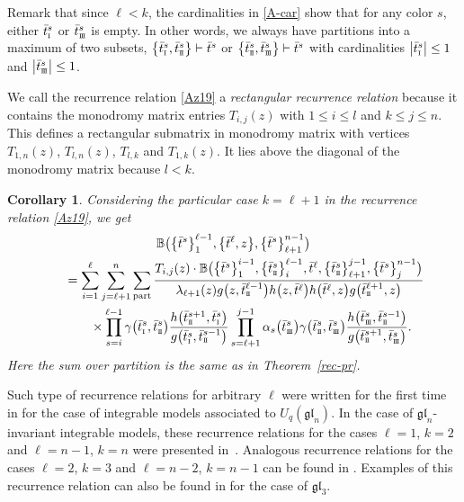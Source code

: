 \documentclass[pdftex]{sigma}
\newcommand{\so}{\scriptscriptstyle \rm I}
\newcommand{\st}{\scriptscriptstyle \rm I\hspace{-1pt}I}
\newcommand{\sth}{\scriptscriptstyle \rm I\hspace{-1pt}I\hspace{-1pt}I}
\newcommand{\bt}{{\bar t}}
\newtheorem{cor}[thm]{Corollary}
\theoremstyle{definition}
\def\BB{{\mathbb{B}}}
\def\r#1{\eqref{#1}}
\begin{document}
Remark that since $\ell<k$, the cardinalities in \eqref{A-car} show that for any color $s$, either $\bt^s_{\so}$ or $\bt^s_{\sth}$ is empty.
In other words, we always have partitions into a maximum of two subsets,
$ \bigl\{\bt^s_{\so},\bt^s_{\st}\bigr\}\vdash \bt^s$ or
$\bigl\{\bt^s_{\st},\bt^s_{\sth}\bigr\}\vdash \bt^s$
with cardinalities $\big|\bt^s_{\so}\big|\leq1$ and $\big|\bt^s_{\sth}\big|\leq1$.

We call the recurrence relation \r{Az19} a {\it rectangular recurrence relation} because
it contains the monodromy matrix entries $T_{i,j}(z)$ with $1\leq i\leq l$ and $k\leq j\leq n$.
This defines a rectangular submatrix in monodromy matrix with
vertices $T_{1,n}(z)$, $T_{l,n}(z)$, $T_{l,k}$ and $T_{1,k}(z)$. It lies above the diagonal of the monodromy matrix because $l<k$.


\begin{cor}\label{cor1}
Considering the particular case $k=\ell+1$ in the recurrence relation \r{Az19}, we get
\begin{gather*}
\BB\bigl(\bigl\{\bt^s\bigr\}_1^{\ell-1},\bigl\{\bt^\ell,z\bigr\},\bigl\{\bt^s\bigr\}_{\ell+1}^{n-1}\bigr)\\
\qquad=
\sum_{i=1}^\ell\sum_{j=\ell+1}^n\sum_{\rm part}\frac{T_{i,j}(z)\cdot
\BB\bigl(\bigl\{\bt^s\bigr\}_1^{i-1},\bigl\{\bt^s_{\st}\bigr\}_i^{\ell-1},\bt^\ell,
\bigl\{\bt^s_{\st}\bigr\}_{\ell+1}^{j-1},\bigl\{\bt^s\bigr\}_{j}^{n-1}\bigr)}
{\lambda_{\ell+1}(z) g\bigl(z,\bt^{\ell-1}_{\st}\bigr)h\bigl(z,\bt^\ell\bigr)h\bigl(\bt^\ell,z\bigr)g\bigl(\bt^{\ell+1}_{\st},z\bigr)}
\\
\qquad\phantom{=}{}\times
\prod_{s=i}^{\ell-1}\gamma\bigl(\bt^{s}_{\so},\bt^s_{\st}\bigr)
\frac{h\bigl(\bt^{s+1}_{\st},\bt^{s}_{\so}\bigr)}
{g\bigl(\bt^{s}_{\so},\bt^{s-1}_{\st}\bigr)}
\prod_{s=\ell+1}^{j-1}\alpha_s\bigl(\bt^s_{\sth}\bigr)\gamma\bigl(\bt^{s}_{\st},\bt^s_{\sth}\bigr)
\frac{h\bigl(\bt^{s}_{\sth},\bar t^{s-1}_{\st}\bigr)}{g\bigl(\bt^{s+1}_{\st},\bt^{s}_{\sth}\bigr)} .
\end{gather*}
Here the sum over partition is the same as in Theorem~{\rm\ref{rec-pr}}.
\end{cor}
Such type of recurrence relations for arbitrary $\ell$ were written for the first time in \cite{LP22} for the case of integrable
models associated to $U_q(\mathfrak{gl}_n)$. In the case of $\mathfrak{gl}_n$-invariant integrable
models, these recurrence relations for the cases $\ell=1$, $k=2$ and $\ell=n-1$, $k=n$
were presented in~\cite{HLPRS-SP17}.
Analogous recurrence relations for the cases
$\ell=2$, $k=3$ and $\ell=n-2$, $k=n-1$ can be found in \cite{G23}.
Examples of this recurrence relation can also be found in \cite{BPRS13} for the case of $\mathfrak{gl}_3$.
\end{document}
